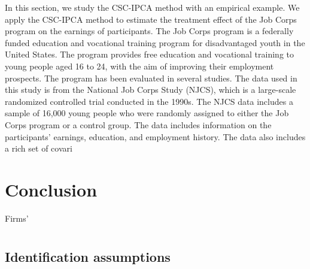 \documentclass[12pt]{article}
\begin{document}
In this section, we study the CSC-IPCA method with an empirical example. We apply the CSC-IPCA method to estimate the treatment effect of the Job Corps program on the earnings of participants. The Job Corps program is a federally funded education and vocational training program for disadvantaged youth in the United States. The program provides free education and vocational training to young people aged 16 to 24, with the aim of improving their employment prospects. The program has been evaluated in several studies. The data used in this study is from the National Job Corps Study (NJCS), which is a large-scale randomized controlled trial conducted in the 1990s. The NJCS data includes a sample of 16,000 young people who were randomly assigned to either the Job Corps program or a control group. The data includes information on the participants' earnings, education, and employment history. The data also includes a rich set of covari
\section{Conclusion} 
\label{sec: conclusion}

Firms' 

\clearpage
\begingroup
{}


\endgroup

\clearpage
\appendix
{}
\renewcommand{\theequation}{\thesection.\arabic{equation}}
\setcounter{equation}{0}

\section{}
\subsection{Identification assumptions}
\end{document}
